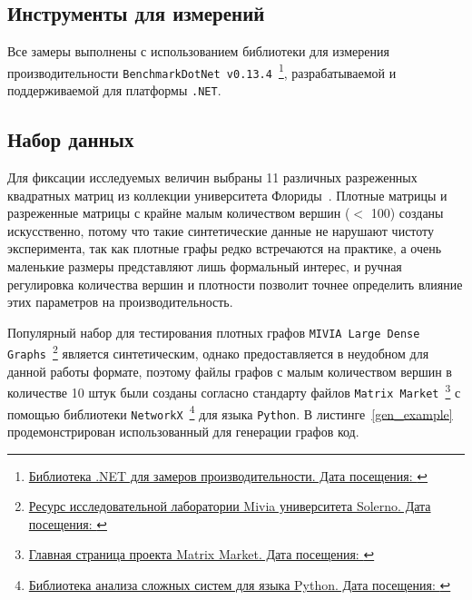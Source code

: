 \subsection{Инструменты для измерений}
\noindent Все замеры выполнены с использованием библиотеки для измерения производительности \texttt{BenchmarkDotNet v0.13.4}~\footnote{\href{https://benchmarkdotnet.org/}{Библиотека .NET для замеров производительности. Дата посещения: }}, разрабатываемой и поддерживаемой для платформы \texttt{.NET}.



\subsection{Набор данных}
\noindent Для фиксации исследуемых величин выбраны 11 различных разреженных квадратных матриц из коллекции университета Флориды~\cite{matrixData}. Плотные матрицы и разреженные матрицы с крайне малым количеством вершин ($<$ 100) созданы искусственно, потому что такие синтетические данные не нарушают чистоту эксперимента, так как плотные графы редко встречаются на практике, а очень маленькие размеры представляют лишь формальный интерес, и ручная регулировка количества вершин и плотности позволит точнее определить влияние этих параметров на производительность.

Популярный набор для тестирования плотных графов \texttt{MIVIA Large Dense Graphs}~\footnote{\href{https://mivia.unisa.it/datasets/graph-database/mivia2-graph-database/}{Ресурс исследовательной лаборатории Mivia университета Solerno. Дата посещения: }} является синтетическим, однако предоставляется в неудобном для данной работы формате, поэтому файлы графов с малым количеством вершин в количестве 10 штук были созданы согласно стандарту файлов \texttt{Matrix Market}~\footnote{\href{https://math.nist.gov/MatrixMarket/}{Главная страница проекта Matrix Market. Дата посещения: }} с помощью библиотеки \texttt{NetworkX}~\footnote{\href{https://networkx.org/}{Библиотека анализа сложных систем для языка Python. Дата посещения: }} для языка \texttt{Python}. В листинге~\ref{gen_example} продемонстрирован использованный для генерации графов код.

